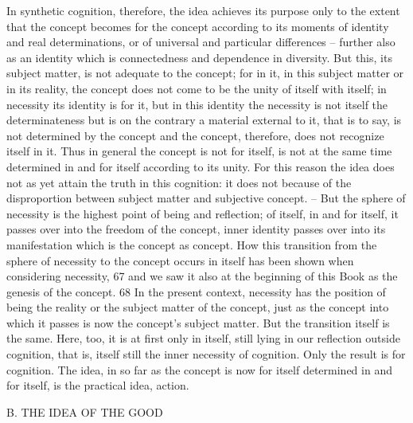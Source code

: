 In synthetic cognition, therefore, the idea achieves its purpose only to the
extent that the concept becomes for the concept according to its moments of
identity and real determinations, or of universal and particular differences –
further also as an identity which is connectedness and dependence in diversity.
But this, its subject matter, is not adequate to the concept; for in it, in this
subject matter or in its reality, the concept does not come to be the unity
of itself with itself; in necessity its identity is for it, but in this identity the
necessity is not itself the determinateness but is on the contrary a material
external to it, that is to say, is not determined by the concept and the
concept, therefore, does not recognize itself in it. Thus in general the
concept is not for itself, is not at the same time determined in and for itself
according to its unity. For this reason the idea does not as yet attain the
truth in this cognition: it does not because of the disproportion between
subject matter and subjective concept. – But the sphere of necessity is the
highest point of being and reflection; of itself, in and for itself, it passes
over into the freedom of the concept, inner identity passes over into its
manifestation which is the concept as concept. How this transition from
the sphere of necessity to the concept occurs in itself has been shown
when considering necessity, 67 and we saw it also at the beginning of this
Book as the genesis of the concept. 68 In the present context, necessity has the
position of being the reality or the subject matter of the concept, just as the
concept into which it passes is now the concept’s subject matter. But the
transition itself is the same. Here, too, it is at first only in itself, still lying
in our reflection outside cognition, that is, itself still the inner necessity
of cognition. Only the result is for cognition. The idea, in so far as the
concept is now for itself determined in and for itself, is the practical idea,
action.

B. THE IDEA OF THE GOOD

